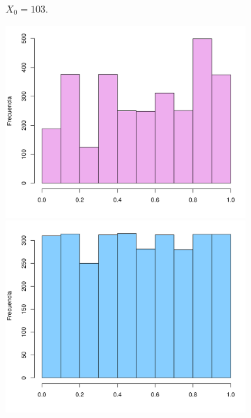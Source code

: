 \documentclass[12pt]{article}
\begin{document}
\begin{figure}
\begin{subfigure}{\textwidth}
			\caption{$X_0 = 103$.}
			\label{semilla103}
		\end{subfigure}
		\begin{subfigure}{\textwidth}
			\centering
			\includegraphics[scale=0.34]{hist_1117-11-43-97.png}
			\includegraphics[scale=0.34]{hist_1117-59-43-97.png}

\end{subfigure}
\end{figure}
\end{document}
